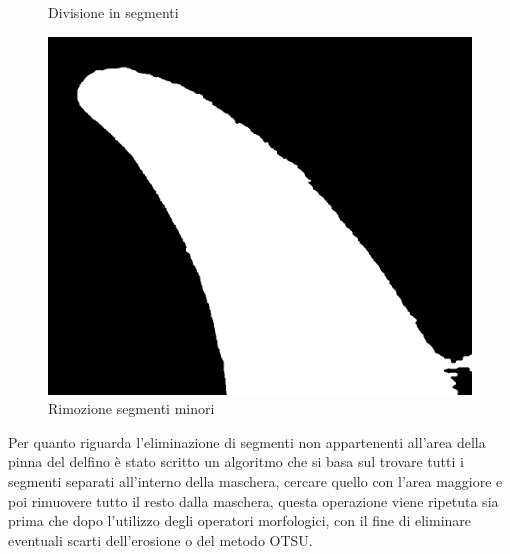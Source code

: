 \documentclass[a4paper,12pt]{report}
\begin{document}
\begin{figure}[H]
\begin{minipage}{0.3\textwidth}
          \caption{Divisione in segmenti}
        \end{minipage}
        \begin{minipage}{0.3\textwidth}
          \centering
          \includegraphics[width=\textwidth]{assets/images/alg_area/clear.png}   
          \caption{Rimozione segmenti minori}
        \end{minipage}
      \end{figure}
     
      Per quanto riguarda l'eliminazione di segmenti non appartenenti all'area della pinna del delfino
      è stato scritto un algoritmo che si basa sul trovare tutti i segmenti separati all'interno della maschera,
      cercare quello con l'area maggiore e poi rimuovere tutto il resto dalla maschera, 
      questa operazione viene ripetuta sia prima che dopo l'utilizzo degli operatori morfologici, con il fine di
      eliminare eventuali scarti dell'erosione o del metodo OTSU.
      \newpage
\end{document}
